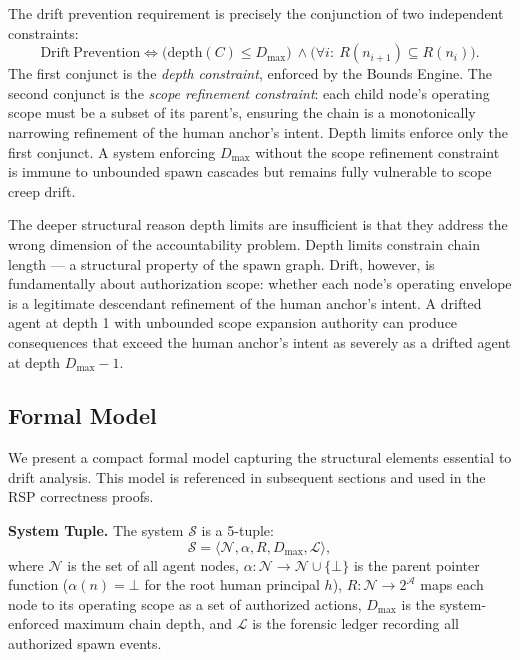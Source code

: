 The drift prevention requirement is precisely the conjunction of two independent constraints:
\begin{equation}
\mathrm{Drift\ Prevention} \iff \bigl( \mathrm{depth}(C) \leq D_{\max} \bigr)\ \land \bigl( \forall i:\ R(n_{i+1}) \subseteq R(n_i) \bigr).
\label{eq:rs-drift-prevention-constraint}
\end{equation}
The first conjunct is the \emph{depth constraint}, enforced by the Bounds Engine. The second conjunct is the \emph{scope refinement constraint}: each child node's operating scope must be a subset of its parent's, ensuring the chain is a monotonically narrowing refinement of the human anchor's intent. Depth limits enforce only the first conjunct. A system enforcing $D_{\max}$ without the scope refinement constraint is immune to unbounded spawn cascades but remains fully vulnerable to scope creep drift.

The deeper structural reason depth limits are insufficient is that they address the wrong dimension of the accountability problem. Depth limits constrain chain length — a structural property of the spawn graph. Drift, however, is fundamentally about authorization scope: whether each node's operating envelope is a legitimate descendant refinement of the human anchor's intent. A drifted agent at depth 1 with unbounded scope expansion authority can produce consequences that exceed the human anchor's intent as severely as a drifted agent at depth $D_{\max} - 1$.

\subsection{Formal Model}
\label{sec:rs-drift-model}

We present a compact formal model capturing the structural elements essential to drift analysis. This model is referenced in subsequent sections and used in the RSP correctness proofs.

\medskip
\noindent\textbf{System Tuple.}
The system $\mathcal{S}$ is a 5-tuple:
\begin{equation}
\mathcal{S} = \langle \mathcal{N}, \alpha, R, D_{\max}, \mathcal{L} \rangle,
\label{eq:rs-system-model}
\end{equation}
where $\mathcal{N}$ is the set of all agent nodes, $\alpha: \mathcal{N} \rightarrow \mathcal{N} \cup \{\bot\}$ is the parent pointer function ($\alpha(n) = \bot$ for the root human principal $h$), $R: \mathcal{N} \rightarrow 2^{\mathcal{A}}$ maps each node to its operating scope as a set of authorized actions, $D_{\max}$ is the system-enforced maximum chain depth, and $\mathcal{L}$ is the forensic ledger recording all authorized spawn events.

